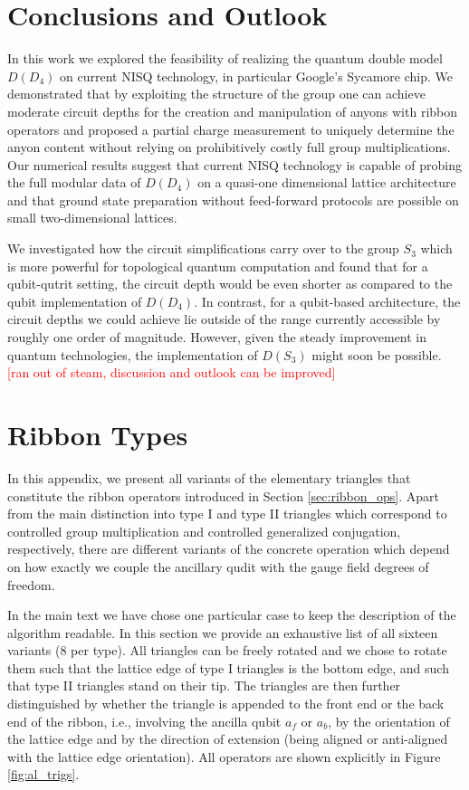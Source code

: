 \documentclass[two column]{article}
\newcommand{\caro}[1]{\textcolor{red}{[#1]}}
\begin{document}
\section{Conclusions and Outlook} \label{sec:outlook}
In this work we explored the feasibility of realizing the quantum double model $D(D_4)$ on current NISQ technology, in particular Google's Sycamore chip. We demonstrated that by exploiting the structure of the group one can achieve moderate circuit depths for the creation and manipulation of anyons with ribbon operators and proposed a partial charge measurement to uniquely determine the anyon content without relying on prohibitively costly full group multiplications. Our numerical results suggest that current NISQ technology is capable of probing the full modular data of $D(D_4)$ on a quasi-one dimensional lattice architecture and that ground state preparation without feed-forward protocols are possible on small two-dimensional lattices. 

We investigated how the circuit simplifications carry over to the group $S_3$ which is more powerful for topological quantum computation and found that for a qubit-qutrit setting, the circuit depth would be even shorter as compared to the qubit implementation of $D(D_4)$. In contrast, for a qubit-based architecture, the circuit depths we could achieve lie outside of the range currently accessible by roughly one order of magnitude. However, given the steady improvement in quantum technologies, the implementation of $D(S_3)$ might soon be possible. 
\caro{ran out of steam, discussion and outlook can be improved}


\FloatBarrier
\onecolumn
\appendix

\section{Ribbon Types}\label{app:ribs}


In this appendix, we present all variants of the elementary triangles that constitute the ribbon operators introduced in Section \ref{sec:ribbon_ops}. Apart from the main distinction into type I and type II triangles which correspond to controlled group multiplication and controlled generalized conjugation, respectively, there are different variants of the concrete operation which depend on how exactly we couple the ancillary qudit with the gauge field degrees of freedom.

In the main text we have chose one particular case to keep the description of the algorithm readable. In this section we provide an exhaustive list of all sixteen variants (8 per type). All triangles can be freely rotated and we chose to rotate them such that the lattice edge of type I triangles is the bottom edge, and such that type II triangles stand on their tip. The triangles are then further distinguished by whether the triangle is appended to the front end or the back end of the ribbon, i.e., involving the ancilla qubit $a_f$ or $a_b$, by the orientation of the lattice edge and by the direction of extension (being aligned or anti-aligned with the lattice edge orientation). All operators are shown explicitly in Figure \ref{fig:al_trigs}. 
\end{document}
